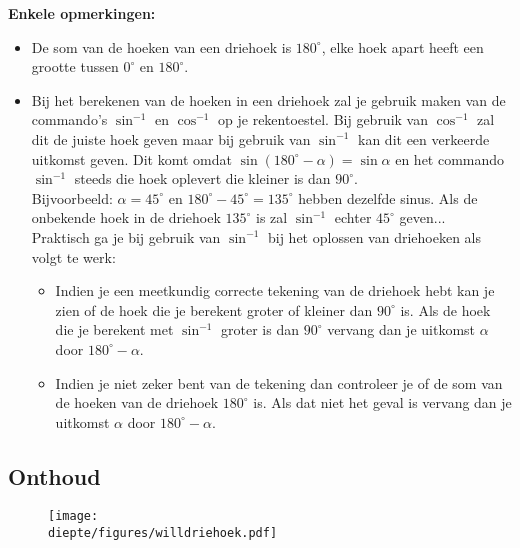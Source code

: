 \documentclass[a4paper,12pt]{article}
\newcommand{\diepte}{./}
\begin{document}
{\bf Enkele opmerkingen:}
\begin{itemize}
        \item De som van de hoeken van een driehoek is $180^\circ$, elke hoek apart heeft een grootte tussen $0^\circ$ en $180^\circ$.
		\item Bij het berekenen van de hoeken in een driehoek zal je gebruik maken van de commando's $\sin^{-1}$ en $\cos^{-1}$ op je rekentoestel. Bij gebruik van $\cos^{-1}$ zal dit de juiste hoek geven maar bij gebruik van $\sin^{-1}$ kan dit een verkeerde uitkomst geven. Dit komt omdat $\sin(180^\circ -\alpha)=\sin\alpha$ en het commando $\sin^{-1}$ steeds die hoek oplevert die kleiner is dan $90^\circ$.\\ Bijvoorbeeld: $\alpha = 45^\circ$ en $180^\circ-45^\circ = 135^\circ$ hebben dezelfde sinus. Als de onbekende hoek in de driehoek $135^\circ$ is zal $\sin^{-1}$ echter $45^\circ$ geven... \\
Praktisch ga je bij gebruik van $\sin^{-1}$ bij het oplossen van driehoeken als volgt te werk:	
	
\begin{itemize}
	\item Indien je een meetkundig correcte tekening van de driehoek hebt kan je zien of de hoek die je berekent groter of kleiner dan $90^\circ$ is. Als de hoek die je berekent met $\sin^{-1}$ groter is dan $90^\circ$ vervang dan je uitkomst $\alpha$ door $180^\circ -\alpha$.
	\item Indien je niet zeker bent van de tekening dan controleer je of de som van de hoeken van de driehoek $180^\circ$ is. Als dat niet het geval is vervang dan je uitkomst $\alpha$ door $180^\circ -\alpha$.
\end{itemize}
	
\end{itemize}

\subsection{Onthoud}

\begin{figure}[h]
\begin{center}
\texttt{[image: \\diepte/figures/willdriehoek.pdf]}
\end{center}
\end{figure}
\end{document}
